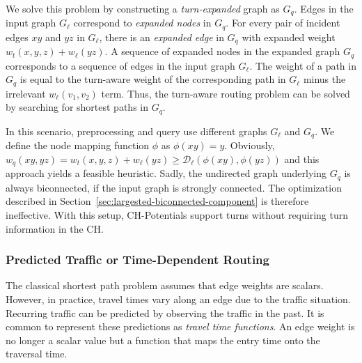 \documentclass[a4paper,UKenglish,cleveref, autoref, thm-restate]{lipics-v2021}
\newcommand*{\dist}{\mathcal{D}}
\begin{document}
We solve this problem by constructing a \emph{turn-expanded} graph as $G_q$.
Edges in the input graph $G_\ell$ correspond to \emph{expanded nodes} in $G_q$.
For every pair of incident edges $x y$ and $y z$ in $G_\ell$, there is an \emph{expanded edge} in $G_q$ with expanded weight $w_t(x,y,z) + w_\ell(y z)$.
A sequence of expanded nodes in the expanded graph $G_q$ corresponds to a sequence of edges in the input graph $G_\ell$.
The weight of a path in $G_q$ is equal to the turn-aware weight of the corresponding path in $G_\ell$ minus the irrelevant $w_\ell(v_1,v_2)$ term.
Thus, the turn-aware routing problem can be solved by searching for shortest paths in $G_q$.

In this scenario, preprocessing and query use different graphs $G_\ell$ and $G_q$.
We define the node mapping function $\phi$ as $\phi(x y) = y$.
Obviously, $w_q(xy, yz) = w_t(x,y,z) + w_\ell(y z) \geq \dist_\ell(\phi(x y), \phi(y z))$ and this approach yields a feasible heuristic.
Sadly, the undirected graph underlying $G_q$ is always biconnected, if the input graph is strongly connected.
The optimization described in Section~\ref{sec:largested-biconnected-component} is therefore ineffective.
With this setup, CH-Potentials support turns without requiring turn information in the CH.


\subsubsection{Predicted Traffic or Time-Dependent Routing}
\label{sec:predicted-traffic}

The classical shortest path problem assumes that edge weights are scalars.
However, in practice, travel times vary along an edge due to the traffic situation.
Recurring traffic can be predicted by observing the traffic in the past.
It is common \cite{bgsv-mtdtt-13,bdpw-dtdrp-16,swz-sfert-20} to represent these predictions as \emph{travel time functions}.
An edge weight is no longer a scalar value but a function that maps the entry time onto the traversal time.
\end{document}
